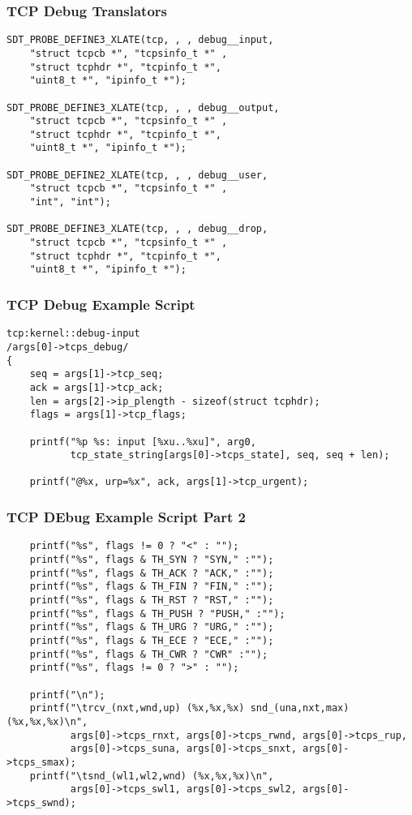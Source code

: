 \documentclass[pdftex]{beamer}
\begin{document}
\begin{frame}[fragile]
  \frametitle{TCP Debug Translators}
\begin{lstlisting}
SDT_PROBE_DEFINE3_XLATE(tcp, , , debug__input,
    "struct tcpcb *", "tcpsinfo_t *" ,
    "struct tcphdr *", "tcpinfo_t *",
    "uint8_t *", "ipinfo_t *");

SDT_PROBE_DEFINE3_XLATE(tcp, , , debug__output,
    "struct tcpcb *", "tcpsinfo_t *" ,
    "struct tcphdr *", "tcpinfo_t *",
    "uint8_t *", "ipinfo_t *");

SDT_PROBE_DEFINE2_XLATE(tcp, , , debug__user,
    "struct tcpcb *", "tcpsinfo_t *" ,
    "int", "int");

SDT_PROBE_DEFINE3_XLATE(tcp, , , debug__drop,
    "struct tcpcb *", "tcpsinfo_t *" ,
    "struct tcphdr *", "tcpinfo_t *",
    "uint8_t *", "ipinfo_t *");
\end{lstlisting}
\end{frame}

\begin{frame}[fragile]
  \frametitle{TCP Debug Example Script}
\begin{lstlisting}
tcp:kernel::debug-input
/args[0]->tcps_debug/
{
	seq = args[1]->tcp_seq;
	ack = args[1]->tcp_ack;
	len = args[2]->ip_plength - sizeof(struct tcphdr);
	flags = args[1]->tcp_flags;
	
	printf("%p %s: input [%xu..%xu]", arg0,
	       tcp_state_string[args[0]->tcps_state], seq, seq + len);

	printf("@%x, urp=%x", ack, args[1]->tcp_urgent);
\end{lstlisting}
\end{frame}

\begin{frame}[fragile]
  \frametitle{TCP DEbug Example Script Part 2}
\begin{lstlisting}
	printf("%s", flags != 0 ? "<" : "");
	printf("%s", flags & TH_SYN ? "SYN," :"");
	printf("%s", flags & TH_ACK ? "ACK," :"");
	printf("%s", flags & TH_FIN ? "FIN," :"");
	printf("%s", flags & TH_RST ? "RST," :"");
	printf("%s", flags & TH_PUSH ? "PUSH," :"");
	printf("%s", flags & TH_URG ? "URG," :"");
	printf("%s", flags & TH_ECE ? "ECE," :"");
	printf("%s", flags & TH_CWR ? "CWR" :"");
	printf("%s", flags != 0 ? ">" : "");

	printf("\n");
	printf("\trcv_(nxt,wnd,up) (%x,%x,%x) snd_(una,nxt,max) (%x,%x,%x)\n",
	       args[0]->tcps_rnxt, args[0]->tcps_rwnd, args[0]->tcps_rup,
	       args[0]->tcps_suna, args[0]->tcps_snxt, args[0]->tcps_smax);
	printf("\tsnd_(wl1,wl2,wnd) (%x,%x,%x)\n",
	       args[0]->tcps_swl1, args[0]->tcps_swl2, args[0]->tcps_swnd);
\end{lstlisting}
\end{frame}
\end{document}
